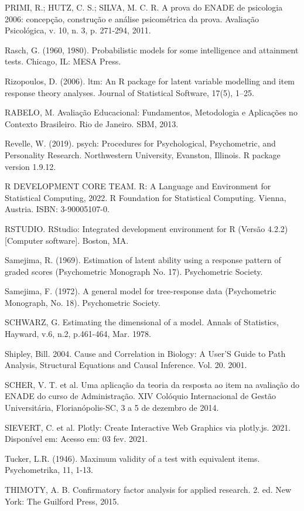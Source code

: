 \documentclass[12pt]{article}
\begin{document}
PRIMI, R.; HUTZ, C. S.; SILVA, M. C. R. A prova do ENADE de psicologia 2006: concepção, construção e análise psicométrica da prova. Avaliação Psicológica, v. 10, n. 3, p. 271-294, 2011.

Rasch, G. (1960, 1980). Probabilistic models for some intelligence and attainment tests. Chicago, IL: MESA Press.

Rizopoulos, D. (2006). ltm: An R package for latent variable modelling and item response theory analyses. Journal of Statistical Software, 17(5), 1–25. 

RABELO, M. Avaliação Educacional: Fundamentos, Metodologia e Aplicações no Contexto Brasileiro. Rio de Janeiro. SBM, 2013.

Revelle, W. (2019). psych: Procedures for Psychological, Psychometric, and Personality Research. Northwestern University, Evanston, Illinois. R package version 1.9.12.

R DEVELOPMENT CORE TEAM. R: A Language and Environment for Statistical Computing, 2022. R Foundation for Statistical Computing. Vienna, Austria. ISBN: 3-90005107-0. 

RSTUDIO. RStudio: Integrated development environment for R (Versão 4.2.2) [Computer software]. Boston, MA. 

Samejima, R. (1969). Estimation of latent ability using a response pattern of graded scores (Psychometric Monograph No. 17). Psychometric Society. 

Samejima, F. (1972). A general model for tree-response data (Psychometric Monograph, No. 18). Psychometric Society. 

SCHWARZ, G. Estimating the dimensional of a model. Annals of Statistics, Hayward, v.6, n.2,
p.461-464, Mar. 1978.

Shipley, Bill. 2004. Cause and Correlation in Biology: A User’S Guide to Path Analysis, Structural Equations and Causal Inference. Vol. 20. 2001.

SCHER, V. T. et al. Uma aplicação da teoria da resposta ao item na avaliação do ENADE do curso de Administração. XIV Colóquio Internacional de Gestão Universitária, Florianópolis-SC, 3 a 5 de dezembro de 2014.

SIEVERT, C. et al. Plotly: Create Interactive Web Graphics via plotly.js. 2021. Disponível em: Acesso em: 03 fev. 2021.

Tucker, L.R. (1946). Maximum validity of a test with equivalent items. Psychometrika, 11, 1-13. 

THIMOTY, A. B. Confirmatory factor analysis for applied research. 2. ed. New York: The Guilford Press, 2015.
\end{document}
